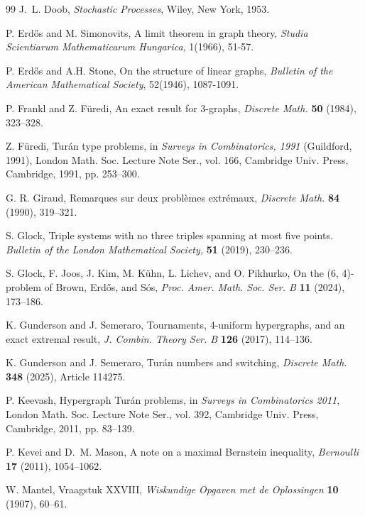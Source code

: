 \documentclass[12pt,a4paper]{article}
\numberwithin{equation}{section}
\theoremstyle{definition}
\theoremstyle{remark}
\begin{document}
\begin{thebibliography}{99}
J.~L. Doob,
\emph{Stochastic Processes},
Wiley, New York, 1953.


P. Erd\H{o}s and M. Simonovits, A limit theorem in graph theory, \emph{Studia Scientiarum Mathematicarum Hungarica}, 1(1966), 51-57.

P. Erd\H{o}s and A.H. Stone, On the structure of linear graphs, \emph{Bulletin of the American Mathematical Society}, 52(1946), 1087-1091.



P. Frankl and Z. F\"uredi,
An exact result for 3-graphs,
\emph{Discrete Math.} \textbf{50} (1984), 323--328.

Z. F\"uredi,
Tur\'an type problems,
in {\em Surveys in Combinatorics, 1991} (Guildford, 1991),
London Math. Soc. Lecture Note Ser., vol. 166, Cambridge Univ. Press, Cambridge, 1991, pp. 253--300.

G. R. Giraud,
Remarques sur deux probl\`emes extr\'emaux,
\emph{Discrete Math.} \textbf{84} (1990), 319--321.

S. Glock, Triple systems with no three triples spanning at most five points. 
\emph{Bulletin of the London Mathematical Society,} \textbf{51} (2019), 230--236.

S. Glock, F. Joos, J. Kim, M. Kühn, L. Lichev, and O. Pikhurko, On the (6, 4)-problem of Brown, Erd\H{o}s, and S\'os,
\emph{Proc. Amer. Math. Soc. Ser. B} \textbf{11} (2024), 173--186.

K. Gunderson and J. Semeraro,
Tournaments, 4-uniform hypergraphs, and an exact extremal result,
\emph{J. Combin. Theory Ser. B} \textbf{126} (2017), 114--136.

K. Gunderson and J. Semeraro,
Tur\'an numbers and switching,
\emph{Discrete Math.} \textbf{348} (2025), Article 114275.

P. Keevash,
Hypergraph Tur\'an problems,
in {\em Surveys in Combinatorics 2011},
London Math. Soc. Lecture Note Ser., vol. 392, Cambridge Univ. Press, Cambridge, 2011, pp. 83--139.

P. Kevei and D.~M. Mason,
A note on a maximal Bernstein inequality,
\emph{Bernoulli} \textbf{17} (2011), 1054--1062.

W. Mantel,
Vraagstuk XXVIII,
\emph{Wiskundige Opgaven met de Oplossingen} \textbf{10} (1907), 60--61.


\end{thebibliography}
\end{document}

